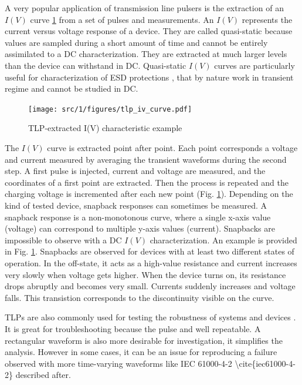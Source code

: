 A very popular application of transmission line pulsers is the extraction of an $I(V)$ curve \ref{fig:iv-curve-extraction} from a set of pulses and measurements.
An $I(V)$ represents the current versus voltage response of a device.
They are called quasi-static because values are sampled during a short amount of time and cannot be entirely assimilated to a DC characterization.
They are extracted at much larger levels than the device can withstand in DC.
Quasi-static $I(V)$ curves are particularly useful for characterization of ESD protections \cite{TLPforESDProtectionCz}, that by nature work in transient regime and cannot be studied in DC.

\begin{figure}[!h]
  \centering
  \texttt{[image: src/1/figures/tlp\_iv\_curve.pdf]}
  \caption{TLP-extracted I(V) characteristic example}
  \label{fig:iv-curve-extraction}
\end{figure}

The $I(V)$ curve is extracted point after point.
Each point corresponds a voltage and current measured by averaging the transient waveforms during the second step.
A first pulse is injected, current and voltage are measured, and the coordinates of a first point are extracted.
Then the process is repeated and the charging voltage is incremented after each new point (Fig. \ref{fig:iv-curve-extraction}).
Depending on the kind of tested device, snapback responses can sometimes be measured.
A snapback response is a non-monotonous curve, where a single x-axis value (voltage) can correspond to multiple y-axis values (current).
Snapbacks are impossible to observe with a DC $I(V)$ characterization.
An example is provided in Fig. \ref{fig:iv-curve-extraction}.
Snapbacks are observed for devices with at least two different states of operation.
In the off-state, it acts as a high-value resistance and current increases very slowly when voltage gets higher.
When the device turns on, its resistance drops abruptly and becomes very small.
Currents suddenly increases and voltage falls.
This transistion corresponds to the discontinuity visible on the curve.

TLPs are also commonly used for testing the robustness of systems and devices \cite{TLPthroubleshooting, LacrampeTransientImmunity}.
It is great for troubleshooting because the pulse and well repeatable.
A rectangular waveform is also more desirable for investigation, it simplifies the analysis.
However in some cases, it can be an issue for reproducing a failure observed with more time-varying waveforms like IEC 61000-4-2 \gls{\cite{iec61000-4-2}} described after.

